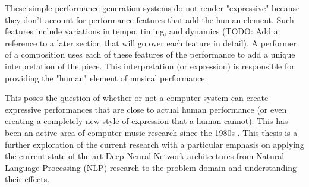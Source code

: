 These simple performance generation systems do not render "expressive" because they don't account for performance features that add the human element. Such features include variations in tempo, timing, and dynamics (TODO: Add a reference to a later section that will go over each feature in detail). A performer of a composition uses each of these features of the performance to add a unique interpretation of the piece. This interpretation (or expression) is responsible for providing the "human" element of musical performance. 

This poses the question of whether or not a computer system can create expressive performances that are close to actual human performance (or even creating a completely new style of expression that a human cannot). This has been an active area of computer music research since the 1980s \cite{friberg2006overview}. This thesis is a further exploration of the current research with a particular emphasis on applying the current state of the art Deep Neural Network architectures from Natural Language Processing (NLP) research to the problem domain and understanding their effects. 

